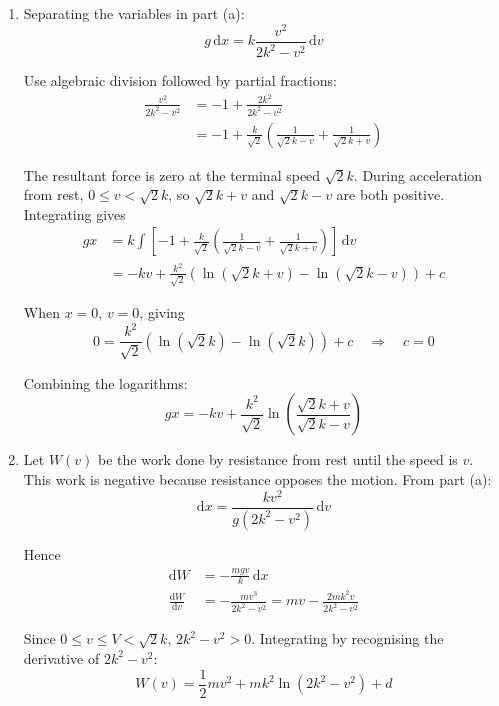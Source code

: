 \documentclass[leqno]{article}
\begin{document}
\begin{enumerate}[
  label=\textbf{\arabic*.},
  leftmargin=*,
  topsep=0pt,
  partopsep=0pt,
  parsep=0pt
]
\begin{djsSolution}
\begin{enumerate}[label=\textbf{(\alph*)}, start=1]
Using Newton's second law, with acceleration \(a=v\frac{\mathrm{d}v}{\mathrm{d}x}\):
\begin{align*}
mv\frac{\mathrm{d}v}{\mathrm{d}x}&=\frac{2kmg}{v}-\frac{mgv}{k}\\
v\frac{\mathrm{d}v}{\mathrm{d}x}&=\frac{g}{kv}\left(2k^2-v^2\right)\\
v^2\frac{\mathrm{d}v}{\mathrm{d}x}&=\frac{g}{k}\left(2k^2-v^2\right)
\end{align*}

\item Separating the variables in part (a):
\[
g\,\mathrm{d}x=k\frac{v^2}{2k^2-v^2}\,\mathrm{d}v
\]

Use algebraic division followed by partial fractions:
\begin{align*}
\frac{v^2}{2k^2-v^2}
&=-1+\frac{2k^2}{2k^2-v^2}\\
&=-1+\frac{k}{\sqrt{2}}\left(\frac{1}{\sqrt{2}k-v}+\frac{1}{\sqrt{2}k+v}\right)
\end{align*}

The resultant force is zero at the terminal speed \(\sqrt{2}k\). During acceleration from rest, \(0\leq v<\sqrt{2}k\), so \(\sqrt{2}k+v\) and \(\sqrt{2}k-v\) are both positive. Integrating gives
\begin{align*}
gx
&=k\int\left[-1+\frac{k}{\sqrt{2}}\left(\frac{1}{\sqrt{2}k-v}+\frac{1}{\sqrt{2}k+v}\right)\right]\,\mathrm{d}v\\
&=-kv+\frac{k^2}{\sqrt{2}}\left(\ln(\sqrt{2}k+v)-\ln(\sqrt{2}k-v)\right)+c
\end{align*}

When \(x=0\), \(v=0\), giving
\[
0=\frac{k^2}{\sqrt{2}}\left(\ln(\sqrt{2}k)-\ln(\sqrt{2}k)\right)+c
\quad\Longrightarrow\quad c=0
\]

Combining the logarithms:
\[
gx=-kv+\frac{k^2}{\sqrt{2}}\ln\left(\frac{\sqrt{2}k+v}{\sqrt{2}k-v}\right)
\]

\item Let \(W(v)\) be the work done by resistance from rest until the speed is \(v\). This work is negative because resistance opposes the motion. From part (a):
\[
\mathrm{d}x=\frac{kv^2}{g(2k^2-v^2)}\,\mathrm{d}v
\]

Hence
\begin{align*}
\mathrm{d}W&=-\frac{mgv}{k}\,\mathrm{d}x\\
\frac{\mathrm{d}W}{\mathrm{d}v}
&=-\frac{mv^3}{2k^2-v^2}
=mv-\frac{2mk^2v}{2k^2-v^2}
\end{align*}

Since \(0\leq v\leq V<\sqrt{2}k\), \(2k^2-v^2>0\). Integrating by recognising the derivative of \(2k^2-v^2\):
\[
W(v)=\frac12mv^2+mk^2\ln(2k^2-v^2)+d
\]


\end{enumerate}
\end{djsSolution}
\end{enumerate}
\end{document}
